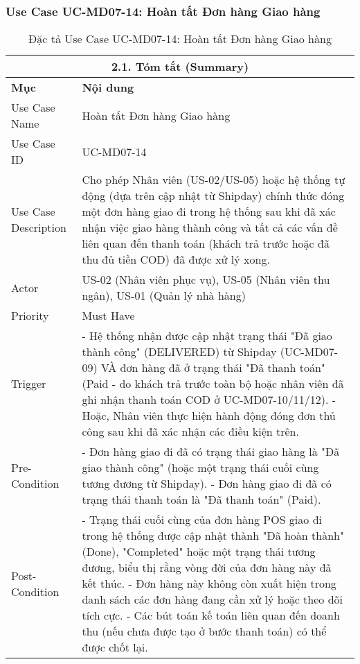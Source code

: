\subsubsection{Use Case UC-MD07-14: Hoàn tất Đơn hàng Giao hàng}
\begin{longtable}{|m{4cm}|p{11cm}|}
\caption{Đặc tả Use Case UC-MD07-14: Hoàn tất Đơn hàng Giao hàng} \label{tab:uc_md07_14_final_full} \\
\hline
\multicolumn{2}{|c|}{\textbf{2.1. Tóm tắt (Summary)}} \\
\hline
\textbf{Mục} & \textbf{Nội dung} \\
\hline
\endhead %
\hline
\endfoot %
\hline
\endlastfoot %
Use Case Name & Hoàn tất Đơn hàng Giao hàng \\
\hline
Use Case ID & UC-MD07-14 \\
\hline
Use Case Description & Cho phép Nhân viên (US-02/US-05) hoặc hệ thống tự động (dựa trên cập nhật từ Shipday) chính thức đóng một đơn hàng giao đi trong hệ thống sau khi đã xác nhận việc giao hàng thành công và tất cả các vấn đề liên quan đến thanh toán (khách trả trước hoặc đã thu đủ tiền COD) đã được xử lý xong. \\
\hline
Actor & US-02 (Nhân viên phục vụ), US-05 (Nhân viên thu ngân), US-01 (Quản lý nhà hàng) \\
\hline
Priority & Must Have \\
\hline
Trigger & - Hệ thống nhận được cập nhật trạng thái "Đã giao thành công" (DELIVERED) từ Shipday (UC-MD07-09) VÀ đơn hàng đã ở trạng thái "Đã thanh toán" (Paid - do khách trả trước toàn bộ hoặc nhân viên đã ghi nhận thanh toán COD ở UC-MD07-10/11/12). \newline - Hoặc, Nhân viên thực hiện hành động đóng đơn thủ công sau khi đã xác nhận các điều kiện trên. \\
\hline
Pre-Condition & - Đơn hàng giao đi đã có trạng thái giao hàng là "Đã giao thành công" (hoặc một trạng thái cuối cùng tương đương từ Shipday). \newline - Đơn hàng giao đi đã có trạng thái thanh toán là "Đã thanh toán" (Paid). \\
\hline
Post-Condition & - Trạng thái cuối cùng của đơn hàng POS giao đi trong hệ thống được cập nhật thành "Đã hoàn thành" (Done), "Completed" hoặc một trạng thái tương đương, biểu thị rằng vòng đời của đơn hàng này đã kết thúc. \newline - Đơn hàng này không còn xuất hiện trong danh sách các đơn hàng đang cần xử lý hoặc theo dõi tích cực. \newline - Các bút toán kế toán liên quan đến doanh thu (nếu chưa được tạo ở bước thanh toán) có thể được chốt lại. \\

\end{longtable}
